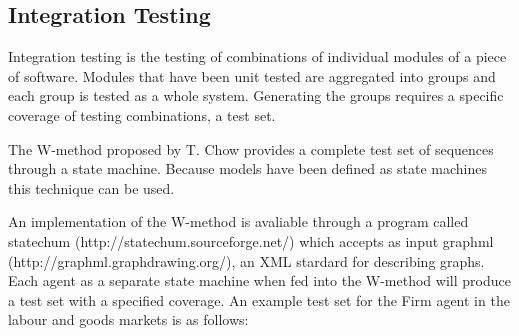 \subsection{Integration Testing}


Integration testing is the testing of combinations of individual modules of a
piece of software. Modules that have been unit tested are aggregated into
groups and each group is tested as a whole system. Generating the groups
requires a specific coverage of testing combinations, a test set.

The W-method proposed by T. Chow \cite{CHOW:1978} provides a complete test set
of sequences through a state machine. Because models have been defined as state
machines this technique can be used.

An implementation of the W-method is avaliable through a program called
statechum \cite{WALKINSHAW:2007,WALKINSHAW:2008}
(http://statechum.sourceforge.net/) which accepts as input graphml
(http://graphml.graphdrawing.org/), an XML stardard for describing graphs.
Each agent as a separate state machine when fed into the W-method will
produce a test set with a specified coverage. An example test set for the Firm
agent in the labour and goods markets is as follows:

